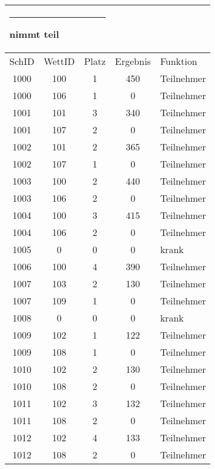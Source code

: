 \documentclass[pagesize,11pt,twoside]{scrartcl}
\def\TabKopf#1#2{\multicolumn{#2}{l}{\rule{1em}{0ex}\rule{0cm}{2.73ex}\textbf{#1}}\\\hline}
\begin{document}
\begin{tabular}[t]{ccccl}
 \TabKopf{nimmt teil}{3}
  SchID&WettID&Platz&Ergebnis&Funktion\\\hline
1000&100&1&450&Teilnehmer\\
1000&106&1&0&Teilnehmer\\
1001&101&3&340&Teilnehmer\\
1001&107&2&0&Teilnehmer\\
1002&101&2&365&Teilnehmer\\
1002&107&1&0&Teilnehmer\\
1003&100&2&440&Teilnehmer\\
1003&106&2&0&Teilnehmer\\
1004&100&3&415&Teilnehmer\\
1004&106&2&0&Teilnehmer\\
1005&0&0&0&krank\\
1006&100&4&390&Teilnehmer\\
1007&103&2&130&Teilnehmer\\
1007&109&1&0&Teilnehmer\\
1008&0&0&0&krank\\
1009&102&1&122&Teilnehmer\\
1009&108&1&0&Teilnehmer\\
1010&102&2&130&Teilnehmer\\
1010&108&2&0&Teilnehmer\\
1011&102&3&132&Teilnehmer\\
1011&108&2&0&Teilnehmer\\
1012&102&4&133&Teilnehmer\\
1012&108&2&0&Teilnehmer\\
\end{tabular}
\hfill
\end{document}
